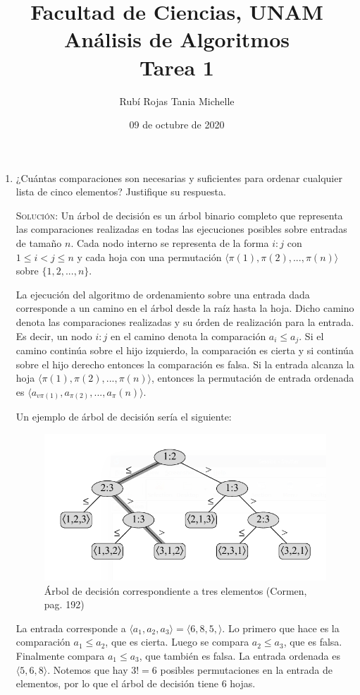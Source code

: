 \documentclass[letterpaper,11pt]{article}
\title{Facultad de Ciencias, UNAM \\ Análisis de Algoritmos \\ Tarea 1}
\author{Rubí Rojas Tania Michelle}
\date{09 de octubre de 2020}
\begin{document}
\maketitle

\begin{enumerate}
    \item ¿Cuántas comparaciones son necesarias y suficientes para ordenar 
    cualquier lista de cinco elementos? Justifique su respuesta.

    \textsc{Solución:} Un árbol de decisión es un árbol binario completo que 
    representa las comparaciones realizadas en todas las ejecuciones posibles 
    sobre entradas de tamaño $n$. Cada nodo interno se representa de la forma 
    $i:j$ con $1 \leq i < j \leq n$ y cada hoja con una permutación 
    $\langle \pi(1), \pi(2), ..., \pi(n) \rangle$ sobre $\{1, 2, ..., n\}$.

    La ejecución del algoritmo de ordenamiento sobre una entrada dada 
    corresponde a un camino en el árbol desde la raíz hasta la hoja. Dicho 
    camino denota las comparaciones realizadas y su órden de realización para 
    la entrada. Es decir, un nodo $i:j$ en el camino denota la comparación 
    $a_i \leq a_j$. Si el camino continúa sobre el hijo izquierdo, la
    comparación es cierta y si continúa sobre el hijo derecho entonces la 
    comparación es falsa. Si la entrada alcanza la hoja $\langle \pi(1), 
    \pi(2), ..., \pi(n) \rangle$, entonces la permutación de entrada ordenada 
    es $\langle a_{v\pi(1)}, a_{\pi(2)}, ..., a_\pi(n) \rangle$.

    Un ejemplo de árbol de decisión sería el siguiente:
    \begin{figure}[h]
        \centering
        \includegraphics[width=0.5\linewidth]{imagenes/decision-tree.png}
        \caption{Árbol de decisión correspondiente a tres elementos (Cormen, 
        pag. 192)}
        \label{fig:decision-tree}
    \end{figure}

    La entrada corresponde a $\langle a_1, a_2, a_3 \rangle = \langle 6, 8, 5, 
    \rangle$. Lo primero que hace es la comparación $a_1 \leq a_2$, que es 
    cierta. Luego se compara $a_2 \leq a_3$, que es falsa. Finalmente compara 
    $a_1 \leq a_3$, que también es falsa. La entrada ordenada es $\langle 5, 6, 
    8 \rangle$. Notemos que hay $3! = 6$ posibles permutaciones en la entrada 
    de elementos, por lo que el árbol de decisión tiene $6$ hojas.


\end{enumerate}
\end{document}
